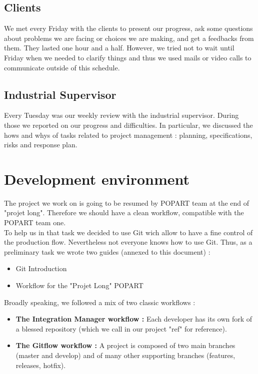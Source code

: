 \subsection{Clients}
We met every Friday with the clients to present our progress, ask some
questions about problems we are facing or choices we are making, and
get a feedbacks from them. They lasted one hour and a half. However,
we tried not to wait until Friday when we needed to clarify things and
thus we used mails or video calls to communicate outside of this
schedule.

\subsection{Industrial Supervisor}
Every Tuesday was our weekly review with the industrial
supervisor. During those we reported on our progress and
difficulties. In particular, we discussed the hows and whys of tasks
related to project management : planning, specifications, risks and
response plan.

\section{Development environment}
The project we work on is going to be resumed by POPART team
at the end of "projet long". Therefore we should have a clean workflow,
compatible with the POPART team one.\\

\noindent
To help us in that task we decided to use Git wich allow to have
a fine control of the production flow.
Nevertheless not everyone knows how to use Git.
Thus, as a preliminary task we wrote two guides (annexed to this document) :
\begin{itemize}
  \setlength\itemsep{0em}
  \item Git Introduction
  \item Workflow for the "Projet Long" POPART
\end{itemize}

\noindent
Broadly speaking, we followed a mix of two classic workflows :
\begin{itemize}
  \setlength\itemsep{0em}
  \item \textbf{The Integration Manager workflow :}
    Each developer has its own fork of a blessed repository
    (which we call in our project "ref" for reference).
  \item \textbf{The Gitflow workflow :}
    A project is composed of two main branches (master and develop)
    and of many other supporting branches (features, releases, hotfix).
\end{itemize}

